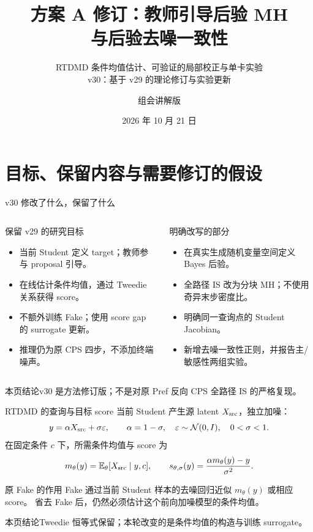 \documentclass[10pt,aspectratio=169]{beamer}
\title[方案 A 修订：PC-MH]{方案 A 修订：教师引导后验 MH\\与后验去噪一致性}
\subtitle{RTDMD 条件均值估计、可验证的局部校正与单卡实验\\v30：基于 v29 的理论修订与实验更新}
\author{组会讲解版}
\date{2026 年 10 月 21 日}
\newcommand{\E}{\mathbb E}
\newcommand{\N}{\mathcal N}
\newcommand{\takeaway}[1]{\begin{exampleblock}{本页结论}\small #1\end{exampleblock}}
\begin{document}
\maketitle

\section{目标、保留内容与需要修订的假设}
\begin{frame}{v30 修改了什么，保留了什么}
\small
\begin{columns}[T,onlytextwidth]
\begin{block}{保留 v29 的研究目标}
\begin{itemize}
\item 当前 Student 定义 target；教师参与 proposal 引导。
\item 在线估计条件均值，通过 Tweedie 关系获得 score。
\item 不额外训练 Fake；使用 score gap 的 surrogate 更新。
\item 推理仍为原 CPS 四步，不添加终端噪声。
\end{itemize}
\end{block}
\begin{alertblock}{明确改写的部分}
\begin{itemize}
\item 在真实生成随机变量空间定义 Bayes 后验。
\item 全路径 IS 改为分块 MH；不使用奇异末步密度比。
\item 明确同一查询点的 Student Jacobian。
\item 新增去噪一致性正则，并报告主/敏感性两组实验。
\end{itemize}
\end{alertblock}
\end{columns}
\takeaway{v30 是方法修订版；不是对原 Pref 反向 CPS 全路径 IS 的严格复现。}
\end{frame}

\begin{frame}{RTDMD 的查询与目标 score}
\small
当前 Student 产生源 latent $X_{\rm src}$，独立加噪：
\begin{equation}\label{eq:query}
y=\alpha X_{\rm src}+\sigma\varepsilon,\qquad
\alpha=1-\sigma,\quad \varepsilon\sim\N(0,I),\quad 0<\sigma<1.
\end{equation}
在固定条件 $c$ 下，所需条件均值与 score 为
\begin{equation}\label{eq:tweedie}
m_\theta(y)=\E_\theta[X_{\rm src}\mid y,c],\qquad
s_{\theta,\sigma}(y)=\frac{\alpha m_\theta(y)-y}{\sigma^2}.
\end{equation}
\begin{block}{原 Fake 的作用}
Fake 通过当前 Student 样本的去噪回归近似 $m_\theta(y)$ 或相应 score。
省去 Fake 后，仍然必须估计\alert{这个前向加噪模型的条件均值}。
\end{block}
\takeaway{Tweedie 恒等式保留；本轮改变的是条件均值的构造与训练 surrogate。}
\end{frame}
\end{document}
